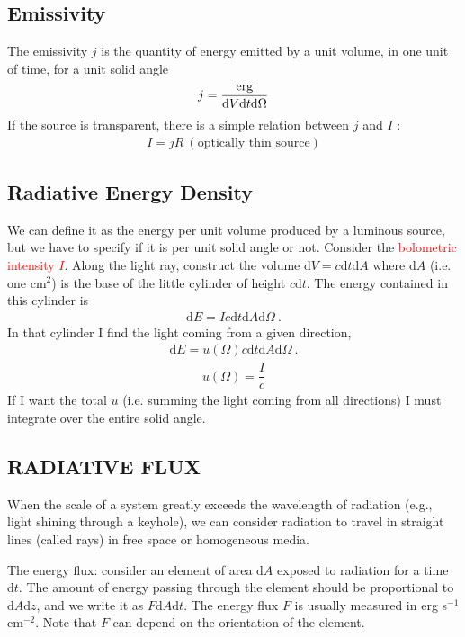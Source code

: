 \documentclass[12pt,a4paper]{article}
\newcommand{\dif}{\mathrm{d}}
\begin{document}
\subsection{Emissivity}
The emissivity $j$ is the quantity of energy emitted by a unit volume, in one unit of time, for a unit solid angle
\begin{align}
j = \dfrac{{\rm erg}}{\dif V \dif t \dif \Omega}
\end{align}
If the source is transparent, there is a simple relation between $j$ and $I$ :
\begin{align}
I = j R ~(\text{optically thin source})
\end{align}

\subsection{Radiative Energy Density}
We can define it as the energy per unit volume produced by a luminous source, but we have to specify if it is per unit solid angle or not. Consider the \textcolor{red}{bolometric intensity $I$}. Along the light ray, construct the volume $\dif V = c\dif t\dif A$ where $\dif A$ (i.e. one cm$^2$) is the base of the little cylinder of height $c \dif t$. The energy contained in this cylinder is
\begin{align}
\dif E = I c \dif t \dif A \dif \Omega ~.
\end{align}
In that cylinder I find the light coming from a given direction, 
\begin{align}
\dif E = u(\Omega) c \dif t \dif A \dif \Omega ~.
\end{align}
\begin{align}
u(\Omega) = \dfrac{I}{c}
\end{align}
If I want the total $u$ (i.e. summing the light coming from all directions) I must integrate over the entire solid angle.


\subsection{RADIATIVE FLUX}
\cite{1979rpa..book.....R} When the scale of a system greatly exceeds the wavelength of radiation (e.g., light shining through a keyhole), we can consider radiation to travel in straight lines (called rays) in free space or homogeneous media. 

The energy flux: consider an element of area $\dif A$ exposed to radiation for a time $\dif t$. The amount of energy passing through the element should be proportional to $\dif A \dif z$, and we write it as $F \dif A \dif t$. The energy flux $F$ is usually measured in erg s$^{-1}$ cm$^{-2}$. Note that $F$ can depend on the orientation of the element.










\end{document}
